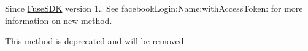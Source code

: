 
\begin{DoxyRefList}
\item[\label{deprecated__deprecated000002}%
\hypertarget{deprecated__deprecated000002}{}%
Global \hyperlink{interface_fuse_s_d_k_a04c181e3ec49e81ba081a5041df412f6}{\mbox{[}Fuse\+S\+D\+K facebook\+Login\+:\mbox{]}} ]Since \hyperlink{interface_fuse_s_d_k}{Fuse\+S\+D\+K} version 1.. See facebook\+Login\+:\+Name\+:with\+Access\+Token\+: for more information on new method.  
\item[\label{deprecated__deprecated000001}%
\hypertarget{deprecated__deprecated000001}{}%
Global \hyperlink{interface_fuse_s_d_k_aa37c46cc4e49f09fd9b2b40a548b61fc}{\mbox{[}Fuse\+S\+D\+K respond\+To\+Application\+Launch\+Options\+:Application\+:\mbox{]}} ]This method is deprecated and will be removed 
\end{DoxyRefList}